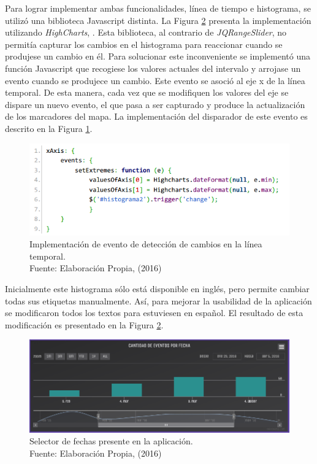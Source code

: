 Para lograr implementar ambas funcionalidades, línea de tiempo e histograma, se utilizó una biblioteca Javascript distinta. La Figura \ref{fig:HistogramaFinal} presenta la implementación utilizando \textit{HighCharts}, \citep{Highcharts}. Esta biblioteca, al contrario de \textit{JQRangeSlider}, no permitía capturar los cambios en el histograma para reaccionar cuando se produjese un cambio en él. Para solucionar este inconveniente se implementó una función Javascript que recogiese los valores actuales del intervalo y arrojase un evento cuando se produjece un cambio. Este evento se asoció al eje x de la línea temporal. De esta manera, cada vez que se modifiquen los valores del eje se dispare un nuevo evento, el que pasa a ser capturado y produce la actualización de los marcadores del mapa. La implementación del disparador de este evento es descrito en la Figura \ref{fig:implementacionCambiosEnEje}.

\begin{figure}[H]
	\centering
	\captionsetup{justification=centering}
	\includegraphics[scale=0.8]{images/onChangeEventTimeline.png}
	\caption[Implementación de evento de detección de cambios en la línea temporal.]{Implementación de evento de detección de cambios en la línea temporal.\\Fuente: Elaboración Propia, (2016)}
	\label{fig:implementacionCambiosEnEje}
\end{figure}

Inicialmente este histograma sólo está disponible en inglés, pero permite cambiar todas sus etiquetas manualmente. Así, para mejorar la usabilidad de la aplicación se modificaron todos los textos para estuviesen en español. El resultado de esta modificación es presentado en la Figura \ref{fig:HistogramaFinal}.

\begin{figure}[H]
	\centering
	\captionsetup{justification=centering}
	\includegraphics[scale=0.6]{images/Histograma.png}
	\caption[Selector de fechas presente en la aplicación.]{Selector de fechas presente en la aplicación.\\Fuente: Elaboración Propia, (2016)}
	\label{fig:HistogramaFinal}
\end{figure}

